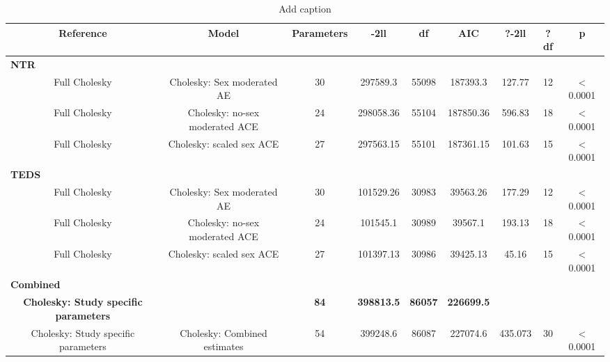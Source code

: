 \begin{table}[htbp]
  \centering
  \caption{Add caption}
    \begin{tabular}{ccccccccc}
    \toprule
    \textbf{Reference} & \textbf{Model} & \textbf{Parameters} & \textbf{-2ll} & \textbf{df} & \textbf{AIC} & \textbf{?-2ll} & \textbf{?df} & \textbf{p} \\
    \midrule
    \multicolumn{9}{l}{\textbf{NTR}} \\
    Full Cholesky & Cholesky: Sex moderated AE & 30    & 297589.3 & 55098 & 187393.3 & 127.77 & 12    & < 0.0001 \\
    Full Cholesky & Cholesky: no-sex moderated ACE & 24    & 298058.36 & 55104 & 187850.36 & 596.83 & 18    & < 0.0001 \\
    Full Cholesky & Cholesky: scaled sex ACE & 27    & 297563.15 & 55101 & 187361.15 & 101.63 & 15    & < 0.0001 \\
    \multicolumn{9}{l}{\textbf{TEDS}} \\
    Full Cholesky & Cholesky: Sex moderated AE & 30    & 101529.26 & 30983 & 39563.26 & 177.29 & 12    & < 0.0001 \\
    Full Cholesky & Cholesky: no-sex moderated ACE & 24    & 101545.1 & 30989 & 39567.1 & 193.13 & 18    & < 0.0001 \\
    Full Cholesky & Cholesky: scaled sex ACE & 27    & 101397.13 & 30986 & 39425.13 & 45.16 & 15    & < 0.0001 \\
    \multicolumn{9}{l}{\textbf{Combined}} \\
    \textbf{Cholesky: Study specific parameters} &       & \textbf{84} & \textbf{398813.5} & \textbf{86057} & \textbf{226699.5} &       &       &  \\
    Cholesky: Study specific parameters & Cholesky: Combined estimates & 54    & 399248.6 & 86087 & 227074.6 & 435.073 & 30    & < 0.0001 \\
\cmidrule{1-8}    \end{tabular}%
  \label{tab:addlabel}%
\end{table}%

